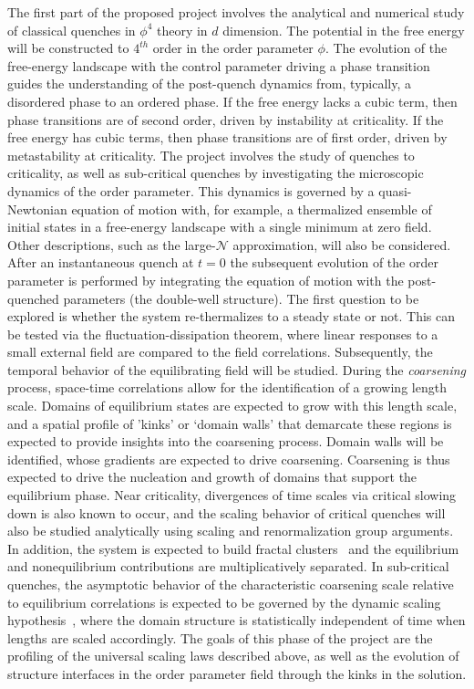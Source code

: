 \documentclass[a4paper,11pt,color]{article}
\begin{document}
The first part of the proposed project involves the analytical and numerical study of classical quenches in $\phi^4$ theory in  {$d$} 
dimension. The potential in the free energy will be constructed to $4^{th}$ order in the order parameter $\phi$. The evolution of the free-energy landscape with the control parameter driving a phase transition guides the understanding of the post-quench dynamics from, typically, a disordered phase to an ordered phase. If the free energy lacks a cubic term, then phase transitions are of second order, driven by instability at criticality. If the free energy has cubic terms, then phase transitions are of first order, driven by metastability at criticality. The project involves the study of quenches to criticality, as well as sub-critical quenches by investigating the microscopic dynamics of the order parameter. This dynamics is governed by a quasi-Newtonian equation of motion with,  {for example, 
a thermalized ensemble of initial states in a free-energy landscape with a single minimum at zero field}. Other descriptions, such as the 
large-$\mathcal{N}$ approximation, will also be considered. After an instantaneous quench at $t=0$ the subsequent evolution of the order parameter is performed by integrating the equation of motion with the post-quenched parameters  {(the double-well structure)}. The first question to be explored is whether the system re-thermalizes to a steady state or not. This can be tested via the fluctuation-dissipation theorem, where linear responses to a small external field are compared to the field correlations. Subsequently, the temporal behavior of the equilibrating field will be studied. During the \textit{coarsening} process, space-time correlations allow for the identification of a growing length scale. Domains of equilibrium states are expected to grow with this length scale, and a spatial profile of 'kinks' or  {`domain walls'} that demarcate these regions is expected to provide insights into the coarsening process. Domain walls will be identified, whose gradients are expected to 
drive coarsening. Coarsening is thus expected to drive the nucleation and growth of domains that support the equilibrium phase. Near criticality, divergences of time scales via critical slowing down is also known to occur, and the scaling behavior of critical quenches will also be studied analytically using scaling and renormalization group arguments. In addition, the system is expected to build fractal clusters~\cite{fractal}
and the equilibrium and nonequilibrium contributions are multiplicatively separated. In sub-critical quenches, the asymptotic behavior of the characteristic coarsening scale relative to equilibrium correlations is expected to be governed by the dynamic scaling hypothesis~\cite{dynscal}, where the domain structure is statistically independent of time when lengths are scaled accordingly. The goals of this phase of the project are the profiling of the universal scaling laws described above, as well as the evolution of structure interfaces in the order parameter field through the kinks in the solution.
\end{document}
